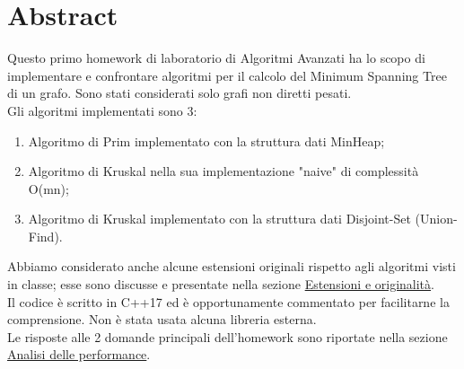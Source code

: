 \section{Abstract}
\label{cap:abstract}

Questo primo homework di laboratorio di Algoritmi Avanzati ha lo scopo di implementare e confrontare algoritmi per il calcolo del Minimum Spanning Tree di un grafo.
Sono stati considerati solo grafi non diretti pesati. \\

\noindent Gli algoritmi implementati sono 3:

\begin{enumerate}
    \item Algoritmo di Prim implementato con la struttura dati MinHeap;
    \item Algoritmo di Kruskal nella sua implementazione "naive" di complessità O(mn);
    \item Algoritmo di Kruskal implementato con la struttura dati Disjoint-Set (Union-Find).
\end{enumerate}

\noindent Abbiamo considerato anche alcune estensioni originali rispetto agli algoritmi visti in classe; esse sono discusse e presentate nella sezione \hyperref[cap:extensions-and-originalities]{Estensioni e originalità}. \\

\noindent Il codice è scritto in C++17 ed è opportunamente commentato per facilitarne la comprensione. Non è stata usata alcuna libreria esterna. \\

\noindent Le risposte alle 2 domande principali dell'homework sono riportate nella sezione \hyperref[cap:performance-analysis]{Analisi delle performance}.
